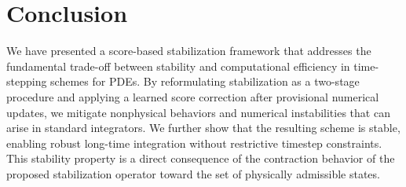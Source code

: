 \documentclass[letterpaper]{article} %
\begin{document}



\section{Conclusion}

We have presented a score-based stabilization framework that addresses the fundamental trade-off between stability and computational efficiency in time-stepping schemes for PDEs. By reformulating stabilization as a two-stage procedure and applying a learned score correction after provisional numerical updates, we mitigate nonphysical behaviors and numerical instabilities that can arise in standard integrators.
We further show that the resulting scheme is stable, enabling robust long-time integration without restrictive timestep constraints. This stability property is a direct consequence of the contraction behavior of the proposed stabilization operator toward the set of physically admissible states.

\end{document}
